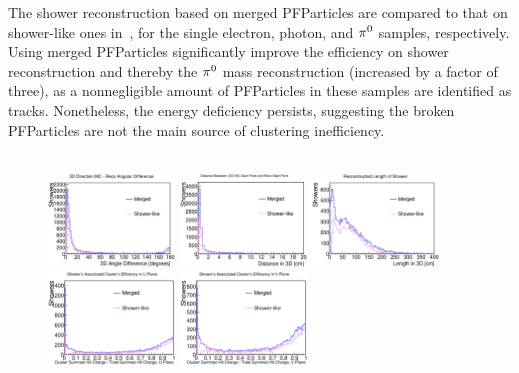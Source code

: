 The shower reconstruction based on merged PFParticles are compared
to that on shower-like ones in~,
for the single electron, photon, and ${\pi}^0$ samples, respectively.
Using merged PFParticles significantly improve the efficiency on
shower reconstruction and thereby the ${\pi}^0$ mass reconstruction
(increased by a factor of three),
as a nonnegligible amount of PFParticles in these samples are identified
as tracks.
Nonetheless, the energy deficiency persists, suggesting the broken
PFParticles are not the main source of clustering inefficiency.\\
\\
\begin{figure}[htbp]
\begin{center}
\includegraphics[width=0.3\textwidth]{figs/ongoing/eminus/AngleDiff.eps}
\includegraphics[width=0.3\textwidth]{figs/ongoing/eminus/StartingPointAcc.eps}
\includegraphics[width=0.3\textwidth]{figs/ongoing/eminus/Length.eps}
\includegraphics[width=0.3\textwidth]{figs/ongoing/eminus/ClusterEffU.eps}
\includegraphics[width=0.3\textwidth]{figs/ongoing/eminus/ClusterEffV.eps}

\end{center}
\end{figure}
